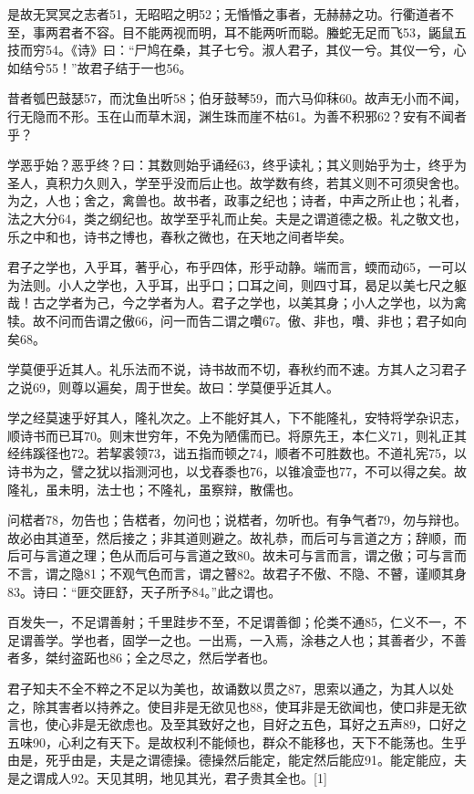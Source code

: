 \documentclass[letterpaper,10pt,english]{sphinxmanual}
\begin{document}
是故无冥冥之志者51，无昭昭之明52；无惛惛之事者，无赫赫之功。行衢道者不至，事两君者不容。目不能两视而明，耳不能两听而聪。螣蛇无足而飞53，鼫鼠五技而穷54。《诗》曰：“尸鸠在桑，其子七兮。淑人君子，其仪一兮。其仪一兮，心如结兮55！”故君子结于一也56。

昔者瓠巴鼓瑟57，而沈鱼出听58；伯牙鼓琴59，而六马仰秣60。故声无小而不闻，行无隐而不形。玉在山而草木润，渊生珠而崖不枯61。为善不积邪62？安有不闻者乎？

学恶乎始？恶乎终？曰：其数则始乎诵经63，终乎读礼；其义则始乎为士，终乎为圣人，真积力久则入，学至乎没而后止也。故学数有终，若其义则不可须臾舍也。为之，人也；舍之，禽兽也。故书者，政事之纪也；诗者，中声之所止也；礼者，法之大分64，类之纲纪也。故学至乎礼而止矣。夫是之谓道德之极。礼之敬文也，乐之中和也，诗书之博也，春秋之微也，在天地之间者毕矣。

君子之学也，入乎耳，著乎心，布乎四体，形乎动静。端而言，蝡而动65，一可以为法则。小人之学也，入乎耳，出乎口；口耳之间，则四寸耳，曷足以美七尺之躯哉！古之学者为己，今之学者为人。君子之学也，以美其身；小人之学也，以为禽犊。故不问而告谓之傲66，问一而告二谓之囋67。傲、非也，囋、非也；君子如向矣68。

学莫便乎近其人。礼乐法而不说，诗书故而不切，春秋约而不速。方其人之习君子之说69，则尊以遍矣，周于世矣。故曰：学莫便乎近其人。

学之经莫速乎好其人，隆礼次之。上不能好其人，下不能隆礼，安特将学杂识志，顺诗书而已耳70。则末世穷年，不免为陋儒而已。将原先王，本仁义71，则礼正其经纬蹊径也72。若挈裘领73，诎五指而顿之74，顺者不可胜数也。不道礼宪75，以诗书为之，譬之犹以指测河也，以戈舂黍也76，以锥飡壶也77，不可以得之矣。故隆礼，虽未明，法士也；不隆礼，虽察辩，散儒也。

问楛者78，勿告也；告楛者，勿问也；说楛者，勿听也。有争气者79，勿与辩也。故必由其道至，然后接之；非其道则避之。故礼恭，而后可与言道之方；辞顺，而后可与言道之理；色从而后可与言道之致80。故未可与言而言，谓之傲；可与言而不言，谓之隐81；不观气色而言，谓之瞽82。故君子不傲、不隐、不瞽，谨顺其身83。诗曰：“匪交匪舒，天子所予84。”此之谓也。

百发失一，不足谓善射；千里跬步不至，不足谓善御；伦类不通85，仁义不一，不足谓善学。学也者，固学一之也。一出焉，一入焉，涂巷之人也；其善者少，不善者多，桀纣盗跖也86；全之尽之，然后学者也。

君子知夫不全不粹之不足以为美也，故诵数以贯之87，思索以通之，为其人以处之，除其害者以持养之。使目非是无欲见也88，使耳非是无欲闻也，使口非是无欲言也，使心非是无欲虑也。及至其致好之也，目好之五色，耳好之五声89，口好之五味90，心利之有天下。是故权利不能倾也，群众不能移也，天下不能荡也。生乎由是，死乎由是，夫是之谓德操。德操然后能定，能定然后能应91。能定能应，夫是之谓成人92。天见其明，地见其光，君子贵其全也。{[}1{]}
\end{document}
